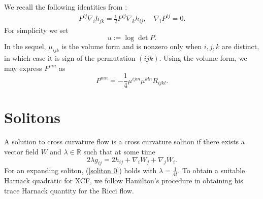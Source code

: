 \documentclass{amsart}
\theoremstyle{definition}
\theoremstyle{remark}
\numberwithin{equation}{section}
\begin{document}
We recall the following identities from \cite[Lemma 1]{Chowcross2002}:
\begin{align}\label{equ: important}
P^{ij}\nabla_ih_{jk}=\frac{1}{2}P^{ij}\nabla_kh_{ij},\quad\nabla_iP^{ij}=0.
\end{align}
For simplicity we set
\[u:=\log\det P.\]
In the sequel, $\mu_{ijk}$ is the volume form and is nonzero only when $i,j,k$ are distinct, in which case it is sign of the permutation $(ijk)$. Using the volume form, we may express $P^{mn}$ as
\begin{equation}
P^{mn}=-\frac{1}{4}\mu^{ijm}\mu^{kln}R_{ijkl}.
\end{equation}
\section{Solitons}
A solution to cross curvature flow is a cross curvature soliton if there exists a vector field $W$ and $\lambda\in \mathbb{R}$ such that at some time
\begin{equation}\label{soliton 0}
2\lambda g_{ij}=2h_{ij}+\nabla_iW_j+\nabla_jW_i.
\end{equation}
For an expanding soliton, (\ref{soliton 0}) holds with $\lambda=\frac{1}{4t}.$
To obtain a suitable Harnack quadratic for XCF, we follow Hamilton's procedure in obtaining his trace Harnack quantity for the Ricci flow.
\end{document}
